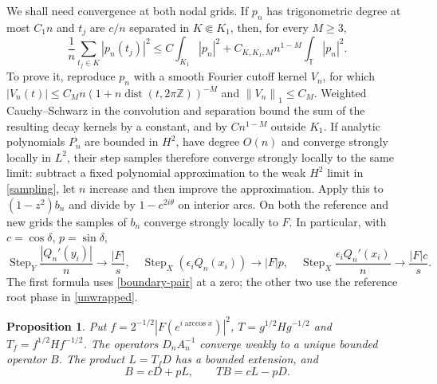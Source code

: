 \documentclass[a4paper,11pt]{amsart}
\newtheorem{proposition}[theorem]{Proposition}
\theoremstyle{remark}\newtheorem{remark}[theorem]{Remark}
\newcommand{\T}{\mathbb T}
\newcommand{\norm}[1]{\left\lVert#1\right\rVert}
\begin{document}
We shall need convergence at both nodal grids. If $p_n$ has
trigonometric degree at most $C_1n$ and $t_j$ are $c/n$ separated
in $K\Subset K_1$, then, for every $M\ge3$,
\begin{equation}\label{sampling}
 \frac1n\sum_{t_j\in K}|p_n(t_j)|^2
 \le C\int_{K_1}|p_n|^2
 +C_{K,K_1,M}n^{1-M}\int_\T|p_n|^2.
\end{equation}
To prove it, reproduce $p_n$ with a smooth Fourier cutoff kernel
$V_n$, for which $|V_n(t)|\le C_Mn(1+n\operatorname{dist}(t,2\pi\mathbb Z))^{-M}$
and $\norm{V_n}_1\le C_M$. Weighted Cauchy--Schwarz in the convolution
and separation bound the sum of the resulting decay kernels by a
constant, and by $Cn^{1-M}$ outside $K_1$.
If analytic polynomials $P_n$ are bounded in $H^2$, have degree
$O(n)$ and converge strongly locally in $L^2$, their step samples
therefore converge strongly locally to the same limit: subtract a
fixed polynomial approximation to the weak $H^2$ limit in
\eqref{sampling}, let $n$ increase and then improve the approximation.
Apply this to $(1-z^2)b_n$ and divide by $1-e^{2i\theta}$ on interior
arcs. On both the reference and new grids the samples of $b_n$
converge strongly locally to $F$. In particular, with
$c=\cos\delta$, $p=\sin\delta$,
\begin{equation}\label{sample-identification}
 \operatorname{Step}_Y\frac{|Q_n'(y_i)|}{n}\longrightarrow\frac{|F|}{s},
 \quad \operatorname{Step}_X(\epsilon_iQ_n(x_i))\longrightarrow|F|p,
 \quad \operatorname{Step}_X\frac{\epsilon_iQ_n'(x_i)}n
 \longrightarrow\frac{|F|c}{s}.
\end{equation}
The first formula uses \eqref{boundary-pair} at a zero; the other
two use the reference root phase in \eqref{unwrapped}.

\begin{proposition}\label{inverse}
Put $f=2^{-1/2}|F(e^{i\arccos x})|^2$,
$T=g^{1/2}Hg^{-1/2}$ and $T_f=f^{1/2}Hf^{-1/2}$.
The operators $D_nA_n^{-1}$ converge weakly to a unique bounded
operator $B$. The product $L=T_fD$ has a bounded extension, and
\begin{equation}\label{channels}
 B=cD+pL,\qquad TB=cL-pD.
\end{equation}
\end{proposition}
\end{document}
